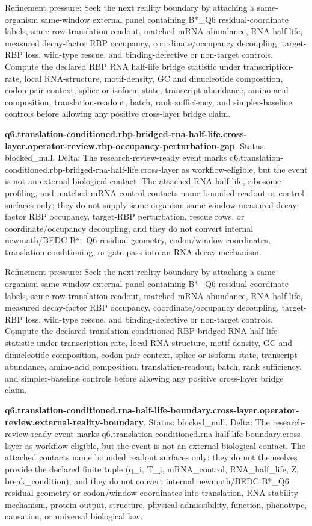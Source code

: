 Refinement pressure: Seek the next reality boundary by attaching a same-organism same-window external panel containing B*\_Q6 residual-coordinate labels, same-row translation readout, matched mRNA abundance, RNA half-life, measured decay-factor RBP occupancy, coordinate/occupancy decoupling, target-RBP loss, wild-type rescue, and binding-defective or non-target controls. Compute the declared RBP RNA half-life bridge statistic under transcription-rate, local RNA-structure, motif-density, GC and dinucleotide composition, codon-pair context, splice or isoform state, transcript abundance, amino-acid composition, translation-readout, batch, rank sufficiency, and simpler-baseline controls before allowing any positive cross-layer bridge claim.

\textbf{q6.translation-conditioned.rbp-bridged-rna-half-life.cross-layer.operator-review.rbp-occupancy-perturbation-gap}. Status: blocked\_null. Delta: The research-review-ready event marks q6.translation-conditioned.rbp-bridged-rna-half-life.cross-layer as workflow-eligible, but the event is not an external biological contact. The attached RNA half-life, ribosome-profiling, and matched mRNA-control contacts name bounded readout or control surfaces only; they do not supply same-organism same-window measured decay-factor RBP occupancy, target-RBP perturbation, rescue rows, or coordinate/occupancy decoupling, and they do not convert internal newmath/BEDC B*\_Q6 residual geometry, codon/window coordinates, translation conditioning, or gate pass into an RNA-decay mechanism.

Refinement pressure: Seek the next reality boundary by attaching a same-organism same-window external panel containing B*\_Q6 residual-coordinate labels, same-row translation readout, matched mRNA abundance, RNA half-life, measured decay-factor RBP occupancy, coordinate/occupancy decoupling, target-RBP loss, wild-type rescue, and binding-defective or non-target controls. Compute the declared translation-conditioned RBP-bridged RNA half-life statistic under transcription-rate, local RNA-structure, motif-density, GC and dinucleotide composition, codon-pair context, splice or isoform state, transcript abundance, amino-acid composition, translation-readout, batch, rank sufficiency, and simpler-baseline controls before allowing any positive cross-layer bridge claim.

\textbf{q6.translation-conditioned.rna-half-life-boundary.cross-layer.operator-review.external-reality-boundary}. Status: blocked\_null. Delta: The research-review-ready event marks q6.translation-conditioned.rna-half-life-boundary.cross-layer as workflow-eligible, but the event is not an external biological contact. The attached contacts name bounded readout surfaces only; they do not themselves provide the declared finite tuple (q\_i, T\_j, mRNA\_control, RNA\_half\_life, Z, break\_condition), and they do not convert internal newmath/BEDC B*\_Q6 residual geometry or codon/window coordinates into translation, RNA stability mechanism, protein output, structure, physical admissibility, function, phenotype, causation, or universal biological law.

